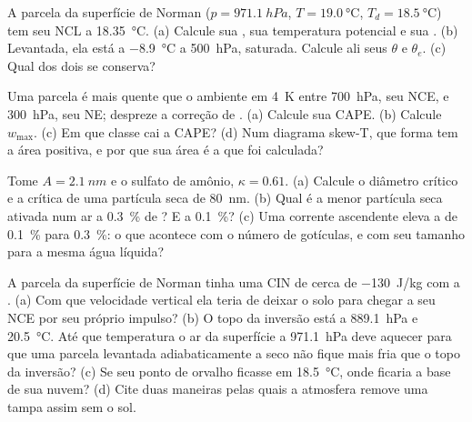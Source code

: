 \begin{exercise}[$\star\star$]\label{exo:b2:atmospheric-thermodynamics:7}
A parcela da superfície de Norman ($p = \qty{971.1}{hPa}$, $T = \qty{19.0}{\celsius}$, $T_d =
\qty{18.5}{\celsius}$) tem seu NCL a \qty{18.35}{\celsius}. (a) Calcule sua , sua
temperatura potencial e sua . (b) Levantada, ela está a
\qty{-8.9}{\celsius} a \qty{500}{hPa}, saturada. Calcule ali seus $\theta$ e $\theta_e$.
(c) Qual dos dois se conserva?
\end{exercise}

\begin{exercise}[$\star\star$]\label{exo:b2:atmospheric-thermodynamics:8}
Uma parcela é mais quente que o ambiente em \qty{4}{K} entre \qty{700}{hPa}, seu NCE, e
\qty{300}{hPa}, seu NE; despreze a correção de . (a) Calcule sua CAPE. (b)
Calcule $w_{\max}$. (c) Em que classe cai a CAPE? (d) Num diagrama skew-T, que
forma tem a área positiva, e por que sua área é a que foi calculada?
\end{exercise}

\begin{exercise}[$\star\star$]\label{exo:b2:atmospheric-thermodynamics:9}
Tome $A = \qty{2.1}{nm}$ e o sulfato de amônio, $\kappa = 0.61$. (a) Calcule o diâmetro crítico
e a  crítica de uma partícula seca de \qty{80}{nm}. (b) Qual é a menor partícula seca
ativada num ar a \qty{0.3}{\percent} de ? E a \qty{0.1}{\percent}? (c) Uma corrente ascendente
eleva a  de \qty{0.1}{\percent} para \qty{0.3}{\percent}: o que acontece com o
número de gotículas, e com seu tamanho para a mesma água líquida?
\end{exercise}

\begin{exercise}[$\star\star\star$]\label{exo:b2:atmospheric-thermodynamics:10}
A parcela da superfície de Norman tinha uma CIN de cerca de \qty{-130}{J/kg} com a .
(a) Com que velocidade vertical ela teria de deixar o solo para chegar a seu NCE por seu próprio
impulso? (b) O topo da inversão está a \qty{889.1}{hPa} e \qty{20.5}{\celsius}. Até que
temperatura o ar da superfície a \qty{971.1}{hPa} deve aquecer para que uma parcela levantada adiabaticamente
a seco não fique mais fria que o topo da inversão? (c) Se seu ponto de orvalho ficasse em
\qty{18.5}{\celsius}, onde ficaria a base de sua nuvem? (d) Cite duas maneiras pelas quais a atmosfera
remove uma tampa assim sem o sol.
\end{exercise}

